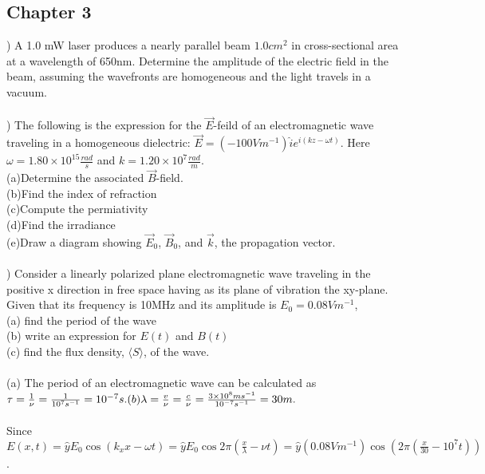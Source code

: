 \documentclass[12pt]{article}
\begin{document}
\subsection*{Chapter 3}
) A 1.0 mW laser produces a nearly parallel beam $1.0cm^{2}$ 
in cross-sectional area at a wavelength of 650nm. Determine the amplitude 
of the electric field in the beam, assuming the wavefronts are homogeneous and 
the light travels in a vacuum. \\\\
) The following is the expression for the $\vec{E}$-feild of an 
electromagnetic wave traveling in a homogeneous dielectric: 
$\vec{E} = (-100Vm^{-1})\hat{i}e^{i(kz-\omega t)}$. Here 
$\omega = 1.80 \times 10^{15}\frac{rad}{s}$ and $k = 1.20 \times 10^{7}\frac{rad}{m}$.\\
\noindent (a)Determine the associated $\vec{B}$-field.\\
\noindent (b)Find the index of refraction\\
\noindent (c)Compute the permiativity\\
\noindent (d)Find the irradiance\\
\noindent (e)Draw a diagram showing $\vec{E}_{0}$, $\vec{B}_{0}$, and $\vec{k}$, the 
propagation vector.\\\\
) Consider a linearly polarized plane electromagnetic 
wave traveling in the positive x direction in free space having as its plane 
of vibration the xy-plane. Given that its frequency is 10MHz and its amplitude 
is $E_{0} = 0.08Vm^{-1}$, \\
(a) find the period of the wave\\
(b) write an expression for $E(t)$ and $B(t)$\\
(c) find the flux density, $\langle S \rangle$, of the wave.\\\\

\noindent (a) The period of an electromagnetic wave can be calculated as 
$\tau = \frac{1}{\nu} =\frac{1}{10^{7}s^{-1}} = 10^{-7}s.\\\\
\noindent (b) \lambda = \frac{v}{\nu} = \frac{c}{\nu} 
= \frac{3\times10^{8}ms^{-1}}{10^{-7}s^{-1}} = 30m.$\\\\
Since $E(x,t) = \hat{y}E_{0}\cos(k_{x}x-\omega t) 
= \hat{y}E_{0}\cos2\pi(\frac{x}{\lambda}-\nu t)
= \hat{y}(0.08Vm^{-1})\cos(2\pi(\frac{x}{30}-10^{7}t))$.\\\\
\end{document}
